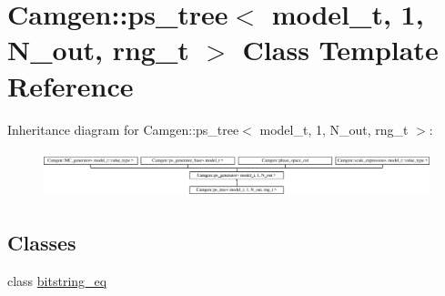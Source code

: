 \hypertarget{a00446}{\section{Camgen\-:\-:ps\-\_\-tree$<$ model\-\_\-t, 1, N\-\_\-out, rng\-\_\-t $>$ Class Template Reference}
\label{a00446}
}
Inheritance diagram for Camgen\-:\-:ps\-\_\-tree$<$ model\-\_\-t, 1, N\-\_\-out, rng\-\_\-t $>$\-:\begin{figure}[H]
\begin{center}
\leavevmode
\includegraphics[height=1.377049cm]{a00446}
\end{center}
\end{figure}
\subsection*{Classes}
\begin{DoxyCompactItemize}
\item 
class \hyperlink{a00032}{bitstring\-\_\-eq}
\end{DoxyCompactItemize}
